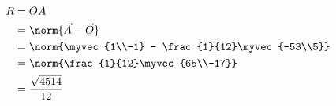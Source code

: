 \solution
\begin{align}
      R &= OA\\
        &= \norm{\vec{A} - \vec{O}}\\
        &= \norm{\myvec{1\\-1} - \frac{1}{12}\myvec{-53\\5}}\\
        &= \norm{\frac{1}{12}\myvec{65\\-17}}\\
        &= \frac{\sqrt{4514}}{12}
\end{align}


